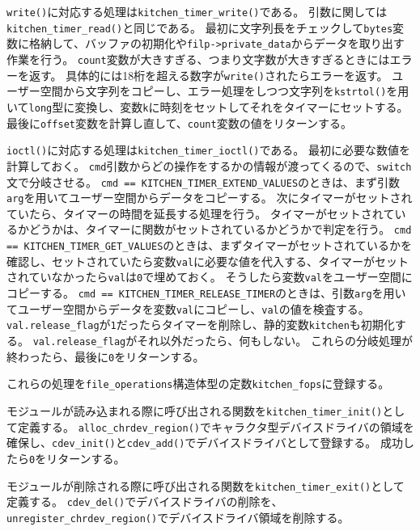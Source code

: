 \documentclass[main]{subfiles}
\begin{document}
\texttt{write()}に対応する処理は\texttt{kitchen\_timer\_write()}である。
引数に関しては\texttt{kitchen\_timer\_read()}と同じである。
最初に文字列長をチェックして\texttt{bytes}変数に格納して、バッファの初期化や\texttt{filp->private\_data}からデータを取り出す作業を行う。
\texttt{count}変数が大きすぎる、つまり文字数が大きすぎるときにはエラーを返す。
具体的には18桁を超える数字が\texttt{write()}されたらエラーを返す。
ユーザー空間から文字列をコピーし、エラー処理をしつつ文字列を\texttt{kstrtol()}を用いて\texttt{long}型に変換し、変数\texttt{k}に時刻をセットしてそれをタイマーにセットする。
最後に\texttt{offset}変数を計算し直して、\texttt{count}変数の値をリターンする。

\texttt{ioctl()}に対応する処理は\texttt{kitchen\_timer\_ioctl()}である。
最初に必要な数値を計算しておく。
\texttt{cmd}引数からどの操作をするかの情報が渡ってくるので、\texttt{switch}文で分岐させる。
\texttt{cmd == KITCHEN\_TIMER\_EXTEND\_VALUES}のときは、まず引数\texttt{arg}を用いてユーザー空間からデータをコピーする。
次にタイマーがセットされていたら、タイマーの時間を延長する処理を行う。
タイマーがセットされているかどうかは、タイマーに関数がセットされているかどうかで判定を行う。
\texttt{cmd == KITCHEN\_TIMER\_GET\_VALUES}のときは、まずタイマーがセットされているかを確認し、セットされていたら変数\texttt{val}に必要な値を代入する、タイマーがセットされていなかったら\texttt{val}は\texttt{0}で埋めておく。
そうしたら変数\texttt{val}をユーザー空間にコピーする。
\texttt{cmd == KITCHEN\_TIMER\_RELEASE\_TIMER}のときは、引数\texttt{arg}を用いてユーザー空間からデータを変数\texttt{val}にコピーし、\texttt{val}の値を検査する。
\texttt{val.release\_flag}が\texttt{1}だったらタイマーを削除し、静的変数\texttt{kitchen}も初期化する。
\texttt{val.release\_flag}がそれ以外だったら、何もしない。
これらの分岐処理が終わったら、最後に\texttt{0}をリターンする。

これらの処理を\texttt{file\_operations}構造体型の定数\texttt{kitchen\_fops}に登録する。

モジュールが読み込まれる際に呼び出される関数を\texttt{kitchen\_timer\_init()}として定義する。
\texttt{alloc\_chrdev\_region()}でキャラクタ型デバイスドライバの領域を確保し、\texttt{cdev\_init()}と\texttt{cdev\_add()}でデバイスドライバとして登録する。
成功したら\texttt{0}をリターンする。

モジュールが削除される際に呼び出される関数を\texttt{kitchen\_timer\_exit()}として定義する。
\texttt{cdev\_del()}でデバイスドライバの削除を、\texttt{unregister\_chrdev\_region()}でデバイスドライバ領域を削除する。
\end{document}

